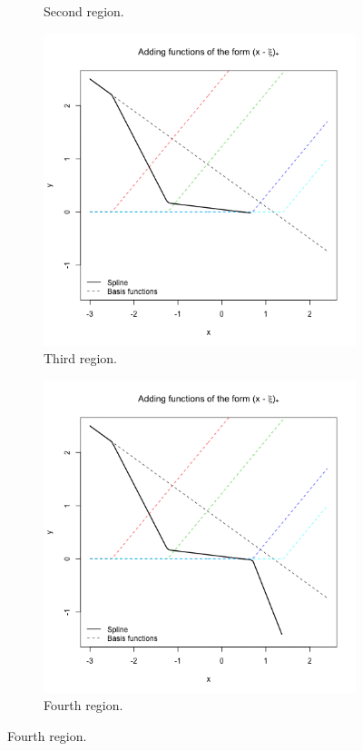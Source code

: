 \documentclass[12pt, letterpaper]{article}
\theoremstyle{definition}
\begin{document}
\begin{figure}
\begin{subfigure}{0.49\textwidth}
\caption{Second region.}
\end{subfigure}
\begin{subfigure}{0.49\textwidth}
\centering
\includegraphics[width=0.9\linewidth]{img/spline_linear/68}
\caption{Third region.}
\end{subfigure}
\hfill
\begin{subfigure}{0.49\textwidth}
\centering
\includegraphics[width=1\linewidth]{img/spline_linear/81}
\caption{Fourth region.}
\end{subfigure}
\end{figure}
\end{document}
